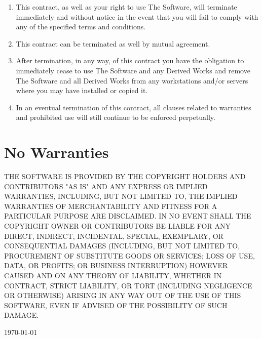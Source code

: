 \documentclass[a4paper,10pt]{article}
\begin{document}
\begin{enumerate}

  \item This contract, as well as your right to use The Software, will
    terminate immediately and without notice in the event that you will fail to
    comply with any of the specified terms and conditions.

  \item This contract can be terminated as well by mutual agreement.

  \item After termination, in any way, of this contract you have the obligation
    to immediately cease to use The Software and any Derived Works and remove
    The Software and all Derived Works from any workstations and/or servers
    where you may have installed or copied it.

  \item In an eventual termination of this contract, all clauses related to
    warranties and prohibited use will still continue to be enforced
    perpetually.

\end{enumerate}

\section{No Warranties}

THE SOFTWARE IS PROVIDED BY THE COPYRIGHT HOLDERS AND CONTRIBUTORS "AS IS" AND
ANY EXPRESS OR IMPLIED WARRANTIES, INCLUDING, BUT NOT LIMITED TO, THE IMPLIED
WARRANTIES OF MERCHANTABILITY AND FITNESS FOR A PARTICULAR PURPOSE ARE
DISCLAIMED. IN NO EVENT SHALL THE COPYRIGHT OWNER OR CONTRIBUTORS BE LIABLE FOR
ANY DIRECT, INDIRECT, INCIDENTAL, SPECIAL, EXEMPLARY, OR CONSEQUENTIAL DAMAGES
(INCLUDING, BUT NOT LIMITED TO, PROCUREMENT OF SUBSTITUTE GOODS OR SERVICES;
LOSS OF USE, DATA, OR PROFITS; OR BUSINESS INTERRUPTION) HOWEVER CAUSED AND ON
ANY THEORY OF LIABILITY, WHETHER IN CONTRACT, STRICT LIABILITY, OR TORT
(INCLUDING NEGLIGENCE OR OTHERWISE) ARISING IN ANY WAY OUT OF THE USE OF THIS
SOFTWARE, EVEN IF ADVISED OF THE POSSIBILITY OF SUCH DAMAGE.

\vspace{2cm}

\begin{flushright}
  \today
\end{flushright}
\end{document}
